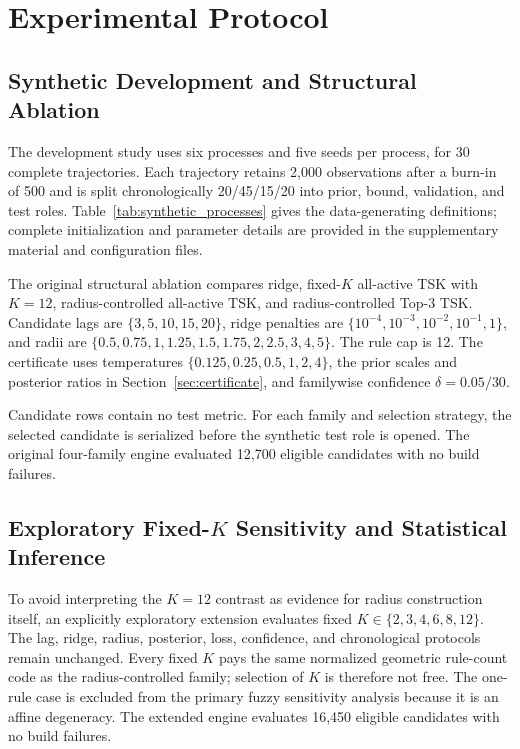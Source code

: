 \section{Experimental Protocol}
\label{sec:experiments}

\subsection{Synthetic Development and Structural Ablation}
The development study uses six processes and five seeds per process, for 30 complete trajectories. Each trajectory retains 2,000 observations after a burn-in of 500 and is split chronologically 20/45/15/20 into prior, bound, validation, and test roles. Table~\ref{tab:synthetic_processes} gives the data-generating definitions; complete initialization and parameter details are provided in the supplementary material and configuration files.



The original structural ablation compares ridge, fixed-$K$ all-active TSK with $K=12$, radius-controlled all-active TSK, and radius-controlled Top-3 TSK. Candidate lags are $\{3,\allowbreak 5,\allowbreak 10,\allowbreak 15,\allowbreak 20\}$, ridge penalties are $\{10^{-4},\allowbreak 10^{-3},\allowbreak 10^{-2},\allowbreak 10^{-1},\allowbreak 1\}$, and radii are $\{0.5,\allowbreak 0.75,\allowbreak 1,\allowbreak 1.25,\allowbreak 1.5,\allowbreak 1.75,\allowbreak 2,\allowbreak 2.5,\allowbreak 3,\allowbreak 4,\allowbreak 5\}$. The rule cap is 12. The certificate uses temperatures $\{0.125,\allowbreak 0.25,\allowbreak 0.5,\allowbreak 1,\allowbreak 2,\allowbreak 4\}$, the prior scales and posterior ratios in Section~\ref{sec:certificate}, and familywise confidence $\delta=0.05/30$.

Candidate rows contain no test metric. For each family and selection strategy, the selected candidate is serialized before the synthetic test role is opened. The original four-family engine evaluated 12,700 eligible candidates with no build failures.

\subsection{Exploratory Fixed-$K$ Sensitivity and Statistical Inference}
To avoid interpreting the $K=12$ contrast as evidence for radius construction itself, an explicitly exploratory extension evaluates fixed $K\in\{2,\allowbreak 3,\allowbreak 4,\allowbreak 6,\allowbreak 8,\allowbreak 12\}$. The lag, ridge, radius, posterior, loss, confidence, and chronological protocols remain unchanged. Every fixed $K$ pays the same normalized geometric rule-count code as the radius-controlled family; selection of $K$ is therefore not free. The one-rule case is excluded from the primary fuzzy sensitivity analysis because it is an affine degeneracy. The extended engine evaluates 16,450 eligible candidates with no build failures.

